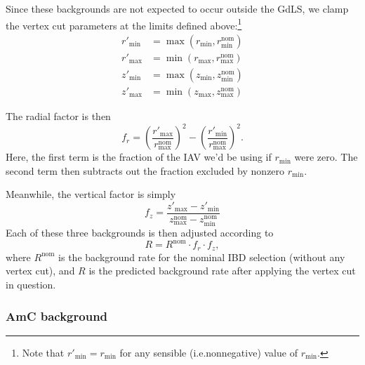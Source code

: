 \documentclass[../thesis.tex]{subfiles}
\begin{document}
Since these backgrounds are not expected to occur outside the GdLS, we clamp the vertex cut parameters at the limits defined above:\footnote{Note that $r'_{\mathrm{min}} = r_{\mathrm{min}}$ for any sensible (i.e.\@ nonnegative) value of $r_{\mathrm{min}}$.}
\begin{equation}
  \begin{aligned}
  r'_{\mathrm{min}} &= \max(r_{\mathrm{min}}, r_{\mathrm{min}}^{\mathrm{nom}})\\
  r'_{\mathrm{max}} &= \min(r_{\mathrm{max}}, r_{\mathrm{max}}^{\mathrm{nom}})\\
  z'_{\mathrm{min}} &= \max(z_{\mathrm{min}}, z_{\mathrm{min}}^{\mathrm{nom}})\\
  z'_{\mathrm{max}} &= \min(z_{\mathrm{max}}, z_{\mathrm{max}}^{\mathrm{nom}})
\end{aligned}
\end{equation}

The radial factor is then
\begin{equation}
  f_r = \left(\frac{r'_{\mathrm{max}}}{r_{\mathrm{max}}^{\mathrm{nom}}}\right)^2 - \left(\frac{r'_{\mathrm{min}}}{r_{\mathrm{max}}^{\mathrm{nom}}} \right)^2.
\end{equation}
Here, the first term is the fraction of the IAV we'd be using if $r_{\mathrm{min}}$ were zero. The second term then subtracts out the fraction excluded by nonzero $r_{\mathrm{min}}$.

Meanwhile, the vertical factor is simply
\begin{equation}
  f_z = \frac{z'_{\mathrm{max}} - z'_{\mathrm{min}}}{z_{\mathrm{max}}^{\mathrm{nom}} - z_{\mathrm{min}}^{\mathrm{nom}}}
\end{equation}
Each of these three backgrounds is then adjusted according to
\begin{equation}
  R = R^{\mathrm{nom}} \cdot f_r \cdot f_z,
\end{equation}
where $R^{\mathrm{nom}}$ is the background rate for the nominal IBD selection (without any vertex cut), and $R$ is the predicted background rate after applying the vertex cut in question.

\subsubsection{AmC background}

\newcommand\zmn{Z}
\end{document}
